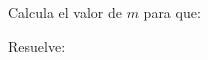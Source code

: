 \documentclass[addpoints,spanish, 12pt,a4paper]{exam}
\begin{document}
\begin{questions}
\begin{multicols}{1}
\begin{parts}
        \end{parts}
        \end{multicols}
        \question Calcula el valor de $m$ para que:
        \begin{multicols}{1}
        \end{multicols}
        \question Resuelve:
        \begin{multicols}{1}
        \begin{parts} 

\end{parts}
\end{multicols}
\end{questions}
\end{document}
